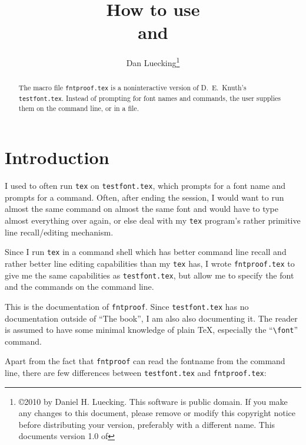\documentclass[draft]{article}
\title{How to use \file{fntproof.tex}\\ and \file{testfont.tex}}
\author{Dan Luecking\thanks{\copyright 2010
 by Daniel H. Luecking. This software is public domain. If you make any
 changes to this document, please remove or modify this copyright notice
 before distributing your version, preferably with a different name. 
 This documents version 1.0 of \file{fntproof}}}
\newcommand\prog[1]{\texttt{#1}}
\newcommand\file[1]{\texttt{#1}}
\renewcommand\"{\verb"}
\begin{document}
\maketitle

\begin{abstract}
 The macro file \file{fntproof.tex} is a noninteractive version of
 D.~E.~Knuth's \file{testfont.tex}. Instead of prompting for font names
 and commands, the user supplies them on the command line, or in a file.
\end{abstract}


\section{Introduction}

I used to often run \prog{tex} on \file{testfont.tex}, which prompts for
a font name and prompts for a command. Often, after ending the session,
I would want to run almost the same command on almost the same font and
would have to type almost everything over again, or else deal with my
\prog{tex} program's rather primitive line recall/editing mechanism.

Since I run \prog{tex} in a command shell which has better command line
recall and rather better line editing capabilities than my \prog{tex} 
has, I wrote \file{fntproof.tex} to give me the same capabilities as
\file{testfont.tex}, but allow me to specify the font and the commands
on the command line.

This is the documentation of \file{fntproof}. Since \file{testfont.tex}
has no documentation outside of ``The \MF book'', I am also also 
documenting it. The reader is assumed to have some minimal knowledge of 
plain \TeX{}, especially the ``\"\font"'' command.

Apart from the fact that \file{fntproof} can read the fontname from the 
command line, there are  few differences between \file{testfont.tex} and 
\file{fntproof.tex}:
\end{document}
